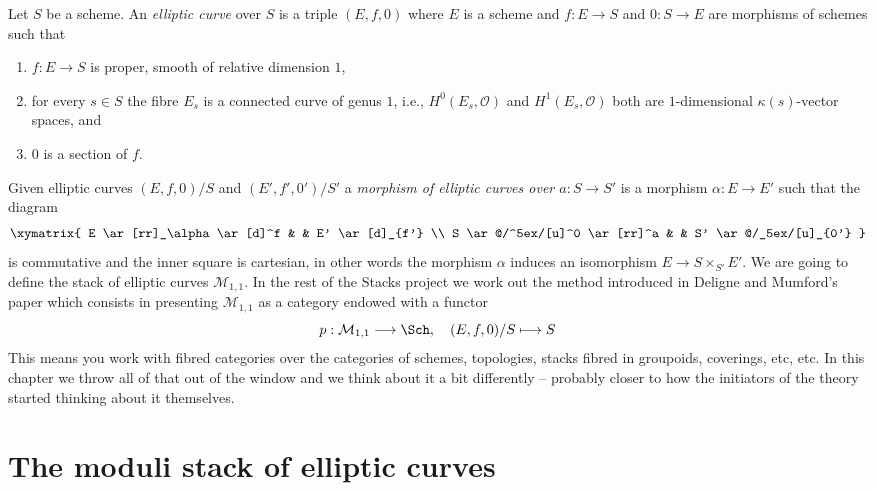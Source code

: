 \noindent
Let $S$ be a scheme. An {\it elliptic curve} over $S$ is a triple
$(E, f, 0)$ where $E$ is a scheme and $f : E \to S$ and $0 : S \to E$
are morphisms of schemes such that
\begin{enumerate}
\item $f : E \to S$ is proper, smooth of relative dimension $1$,
\item for every $s \in S$ the fibre $E_s$ is a connected curve
of genus $1$, i.e., $H^0(E_s, \mathcal{O})$ and $H^1(E_s, \mathcal{O})$
both are $1$-dimensional $\kappa(s)$-vector spaces, and
\item $0$ is a section of $f$.
\end{enumerate}
Given elliptic curves $(E, f, 0)/S$ and $(E', f', 0')/S'$ a
{\it morphism of elliptic curves over $a : S \to S'$}
is a morphism $\alpha : E \to E'$ such that the diagram
$$
\xymatrix{
E \ar[rr]_\alpha \ar[d]^f & & E' \ar[d]_{f'}  \\
S \ar@/^5ex/[u]^0 \ar[rr]^a & & S' \ar@/_5ex/[u]_{0'}
}
$$
is commutative and the inner square is cartesian, in other words the
morphism $\alpha$ induces an isomorphism $E \to S \times_{S'} E'$.
We are going to define the stack of elliptic curves $\mathcal{M}_{1, 1}$.
In the rest of the Stacks project we work out the method introduced in
Deligne and Mumford's paper \cite{DM} which consists in presenting
$\mathcal{M}_{1, 1}$ as a category endowed with a functor
$$
p : \mathcal{M}_{1, 1} \longrightarrow \Sch, \quad
(E, f, 0)/S \longmapsto S
$$
This means you work with fibred categories over the categories of schemes,
topologies, stacks fibred in groupoids, coverings, etc, etc.
In this chapter we throw all of that out of the window and
we think about it a bit differently -- probably closer to how the initiators
of the theory started thinking about it themselves.


\section{The moduli stack of elliptic curves}
\label{section-moduli-elliptic-curves}

